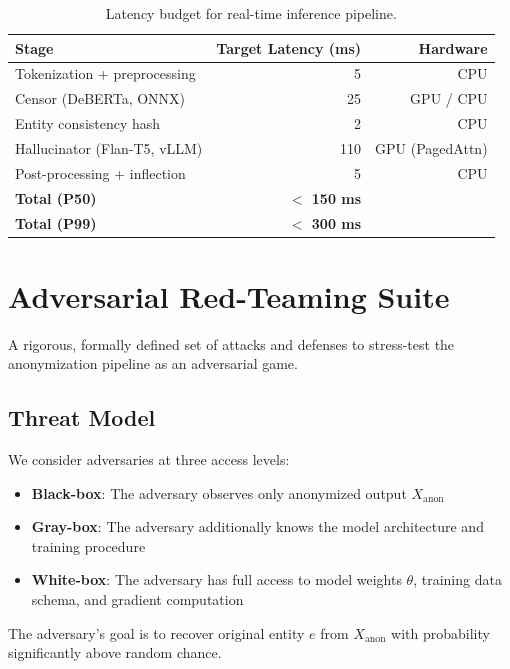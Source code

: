 \documentclass[11pt, a4paper]{article}
\newcommand{\Xanon}{X_{\text{anon}}}
\begin{document}
\begin{table}[H]
\centering
\begin{tabular}{lrr}
\toprule
\textbf{Stage} & \textbf{Target Latency (ms)} & \textbf{Hardware} \\
\midrule
Tokenization + preprocessing & 5 & CPU \\
Censor (DeBERTa, ONNX) & 25 & GPU / CPU \\
Entity consistency hash & 2 & CPU \\
Hallucinator (Flan-T5, vLLM) & 110 & GPU (PagedAttn) \\
Post-processing + inflection & 5 & CPU \\
\midrule
\textbf{Total (P50)} & \textbf{$<$ 150 ms} & \\
\textbf{Total (P99)} & \textbf{$<$ 300 ms} & \\
\bottomrule
\end{tabular}
\caption{Latency budget for real-time inference pipeline.}
\end{table}


\section{Adversarial Red-Teaming Suite}
\label{sec:redteam}

A rigorous, formally defined set of attacks and defenses to stress-test the anonymization pipeline as an adversarial game.

\subsection{Threat Model}

We consider adversaries at three access levels:
\begin{itemize}[nosep]
  \item \textbf{Black-box}: The adversary observes only anonymized output $\Xanon$
  \item \textbf{Gray-box}: The adversary additionally knows the model architecture and training procedure
  \item \textbf{White-box}: The adversary has full access to model weights $\theta$, training data schema, and gradient computation
\end{itemize}
The adversary's goal is to recover original entity $e$ from $\Xanon$ with probability significantly above random chance.
\end{document}
